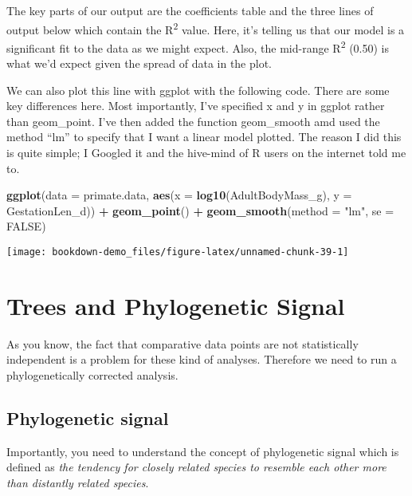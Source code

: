 \documentclass[]{book}
\newenvironment{Shaded}{\begin{snugshade}}{\end{snugshade}}
\newcommand{\KeywordTok}[1]{\textcolor[rgb]{0.13,0.29,0.53}{\textbf{#1}}}
\newcommand{\DataTypeTok}[1]{\textcolor[rgb]{0.13,0.29,0.53}{#1}}
\newcommand{\StringTok}[1]{\textcolor[rgb]{0.31,0.60,0.02}{#1}}
\newcommand{\OtherTok}[1]{\textcolor[rgb]{0.56,0.35,0.01}{#1}}
\newcommand{\OperatorTok}[1]{\textcolor[rgb]{0.81,0.36,0.00}{\textbf{#1}}}
\newcommand{\NormalTok}[1]{#1}
\begin{document}
The key parts of our output are the coefficients table and the three
lines of output below which contain the R\textsuperscript{2} value.
Here, it's telling us that our model is a significant fit to the data as
we might expect. Also, the mid-range R\textsuperscript{2} (0.50) is what
we'd expect given the spread of data in the plot.

We can also plot this line with ggplot with the following code. There
are some key differences here. Most importantly, I've specified x and y
in ggplot rather than geom\_point. I've then added the function
geom\_smooth amd used the method ``lm'' to specify that I want a linear
model plotted. The reason I did this is quite simple; I Googled it and
the hive-mind of R users on the internet told me to.

\begin{Shaded}
\begin{Highlighting}[]
\KeywordTok{ggplot}\NormalTok{(}\DataTypeTok{data =}\NormalTok{ primate.data, }\KeywordTok{aes}\NormalTok{(}\DataTypeTok{x =} \KeywordTok{log10}\NormalTok{(AdultBodyMass_g), }\DataTypeTok{y =}\NormalTok{ GestationLen_d)) }\OperatorTok{+}
\StringTok{  }\KeywordTok{geom_point}\NormalTok{() }\OperatorTok{+}\StringTok{ }
\StringTok{  }\KeywordTok{geom_smooth}\NormalTok{(}\DataTypeTok{method =} \StringTok{"lm"}\NormalTok{, }\DataTypeTok{se =} \OtherTok{FALSE}\NormalTok{)}
\end{Highlighting}
\end{Shaded}

\begin{center}\texttt{[image: bookdown-demo\_files/figure-latex/unnamed-chunk-39-1]} \end{center}

\section{Trees and Phylogenetic
Signal}\label{trees-and-phylogenetic-signal}

As you know, the fact that comparative data points are not statistically
independent is a problem for these kind of analyses. Therefore we need
to run a phylogenetically corrected analysis.

\subsection{Phylogenetic signal}\label{phylogenetic-signal}

Importantly, you need to understand the concept of phylogenetic signal
which is defined as \emph{the tendency for closely related species to
resemble each other more than distantly related species}.
\end{document}
